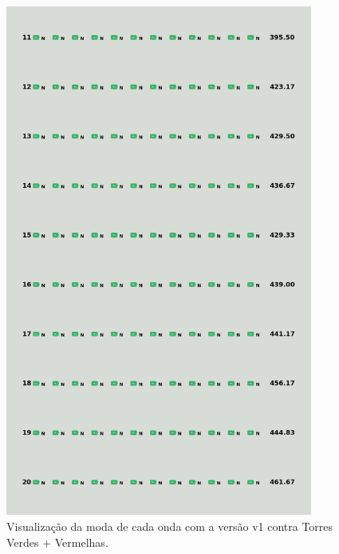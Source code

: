 \begin{figure}[H]
  \centering
  \includegraphics[width=0.9\textwidth]{figuras/td/td_greenred_ai_mode_1_2.png}
  \caption{Visualização da moda de cada onda com a versão v1 contra Torres Verdes + Vermelhas.}
  \label{fig:td-moda-greenred-1-2}
\end{figure}

